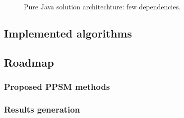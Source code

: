 \begin{figure}[h]
\begin{minipage}[t]{.45\textwidth}
		\caption{Pure Java solution architechture: few dependencies.}
		\label{fig:ppsm-JAVA-arch}
	\end{minipage}
\end{figure}

\subsection{Implemented algorithms}

\subsection{Roadmap}

\subsubsection{Proposed PPSM methods}

\subsubsection{Results generation}